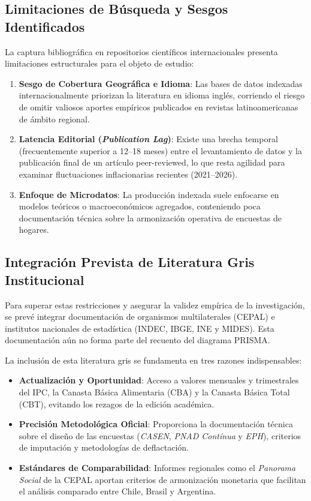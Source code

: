 \subsection{Limitaciones de Búsqueda y Sesgos Identificados}
La captura bibliográfica en repositorios científicos internacionales presenta limitaciones estructurales para el objeto de estudio:
\begin{enumerate}
    \item \textbf{Sesgo de Cobertura Geográfica e Idioma}: Las bases de datos indexadas internacionalmente priorizan la literatura en idioma inglés, corriendo el riesgo de omitir valiosos aportes empíricos publicados en revistas latinoamericanas de ámbito regional.
    \item \textbf{Latencia Editorial (\textit{Publication Lag})}: Existe una brecha temporal (frecuentemente superior a 12--18 meses) entre el levantamiento de datos y la publicación final de un artículo peer-reviewed, lo que resta agilidad para examinar fluctuaciones inflacionarias recientes (2021--2026).
    \item \textbf{Enfoque de Microdatos}: La producción indexada suele enfocarse en modelos teóricos o macroeconómicos agregados, conteniendo poca documentación técnica sobre la armonización operativa de encuestas de hogares.
\end{enumerate}

\subsection{Integración Prevista de Literatura Gris Institucional}
Para superar estas restricciones y asegurar la validez empírica de la investigación, se prevé integrar documentación de organismos multilaterales (CEPAL) e institutos nacionales de estadística (INDEC, IBGE, INE y MIDES). Esta documentación aún no forma parte del recuento del diagrama PRISMA.

La inclusión de esta literatura gris se fundamenta en tres razones indispensables:
\begin{itemize}
    \item \textbf{Actualización y Oportunidad}: Acceso a valores mensuales y trimestrales del IPC, la Canasta Básica Alimentaria (CBA) y la Canasta Básica Total (CBT), evitando los rezagos de la edición académica.
    \item \textbf{Precisión Metodológica Oficial}: Proporciona la documentación técnica sobre el diseño de las encuestas (\textit{CASEN}, \textit{PNAD Contínua} y \textit{EPH}), criterios de imputación y metodologías de deflactación.
    \item \textbf{Estándares de Comparabilidad}: Informes regionales como el \textit{Panorama Social} de la CEPAL aportan criterios de armonización monetaria que facilitan el análisis comparado entre Chile, Brasil y Argentina.
\end{itemize}

